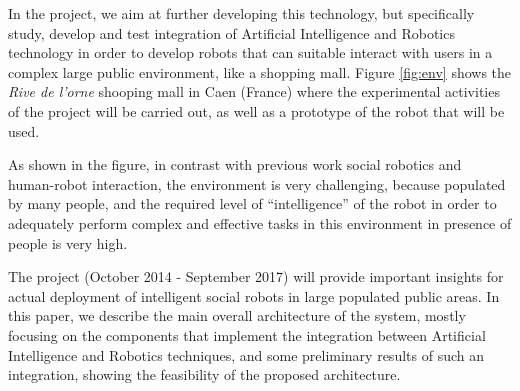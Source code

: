 In the \coaches project, we aim at further developing this technology, but specifically study, develop and test integration of Artificial Intelligence and Robotics technology in order to develop robots that can suitable interact with users in a complex large public environment, like a shopping mall.
Figure \ref{fig:env} shows the \emph{Rive de l'orne} shooping mall in Caen (France) where the experimental activities of the project will be carried out, as well as a prototype of the robot that will be used.

As shown in the figure, in contrast with previous work social robotics and human-robot interaction, the environment is very challenging, because populated by many people, and the required level of ``intelligence'' of the robot in order to adequately perform complex and effective tasks in this environment in presence of people is very high.

The \coaches project (October 2014 - September 2017) will provide important insights for actual deployment of intelligent social robots in large populated public areas. 
In this paper, we describe the main overall architecture of the system, mostly focusing on the components that implement the integration between Artificial Intelligence and Robotics techniques, and some preliminary results of such an integration, showing the feasibility of the proposed architecture.



